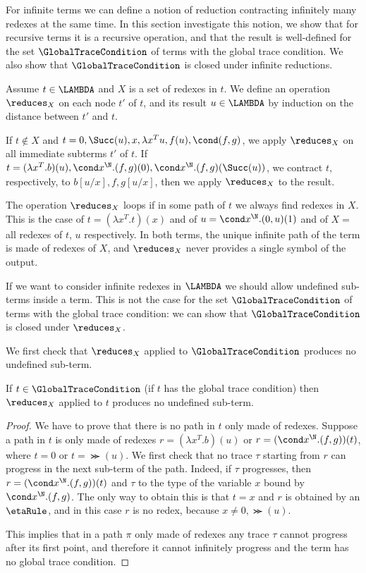 For infinite terms we can define a notion of reduction contracting infinitely many redexes at the same time.
In this section investigate this notion, 
we show that for recursive terms it is a recursive operation, and that the result
is well-defined for the set $\GlobalTraceCondition$ of terms with the global trace condition. 
We also show that $\GlobalTraceCondition$ is closed under infinite reductions.

Assume $t \in \LAMBDA$ and $X$ is a set of redexes in $t$. We define an operation $\reduces_X$ 
on each node $t'$ of $t$, and its result $u \in \LAMBDA$ by induction on the distance between
$t'$ and $t$.

If $t \not \in X$ and $t=0,\Succ(u), x, \lambda x^Tu, f(u), \cond(f,g)$, we apply $\reduces_X$
on all immediate subterms $t'$ of $t$. If $t = (\lambda x^T.b)(u), \cond x^\N.(f,g)(0), \cond x^\N.(f,g)(\Succ(u))$,
we contract $t$, respectively, to $b[u/x], f, g[u/x]$, then we apply $\reduces_X$ to the result.

The operation $\reduces_X$ loops if in some path of $t$ we always find redexes in $X$. This is the case of 
$t = (\lambda x^T.t)(x)$ and of $u=\cond x^\N.(0,u)(1)$ and of $X=$ all redexes of $t$, $u$ respectively. 
In both terms, the unique infinite path of the term is made of redexes of $X$, and $\reduces_X$ never
provides a single symbol of the output.

If we want to consider infinite redexes in $\LAMBDA$ we should allow undefined sub-terms inside a term.
This is not the case for the set $\GlobalTraceCondition$ of terms with the global trace condition:
we can show that $\GlobalTraceCondition$ is closed under $\reduces_X$.

We first check that $\reduces_X$ applied to $\GlobalTraceCondition$ produces no undefined sub-term.

\begin{lemma}
If $t \in \GlobalTraceCondition$ (if $t$ has the global trace condition)
then $\reduces_X$ applied to $t$ produces no undefined sub-term.
\end{lemma}

\begin{proof}
We have to prove that there is no path in $t$ only made  of redexes.
Suppose a path in $t$ is only made  of redexes 
$r=(\lambda x^T.b)(u)$ or $r=(\cond x^\N.(f,g))(t)$, where $t=0$ or $t=\Succ(u)$. 
We first check that no trace $\tau$ starting from $r$ can progress in the next sub-term of the path.
Indeed, if $\tau$ progresses, then $r=(\cond x^\N.(f,g))(t)$
and $\tau$ to the type of the variable $x$ bound by $\cond x^\N.(f,g)$. 
The only way to obtain this is that $t=x$ and $r$ is obtained by an $\etaRule$,
and in this case $r$ is no redex, because $x \not = 0, \Succ(u)$.

This implies that in a path $\pi$ only made of redexes any trace $\tau$ 
cannot progress after its first point, and therefore it cannot infinitely progress and the term has
no global trace condition.
\end{proof}


